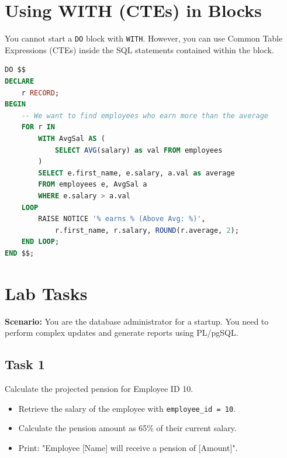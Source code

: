 \documentclass[12pt,a4paper]{article}
\newif\ifshowsolutions
\begin{document}
\newpage
\section{Using WITH (CTEs) in Blocks}

You cannot start a \texttt{DO} block with \texttt{WITH}. However, you can use Common Table Expressions (CTEs) inside the SQL statements contained within the block.

\begin{lstlisting}[language=SQL, caption={CTE inside Anonymous Block}]
DO $$ 
DECLARE
    r RECORD;
BEGIN
    -- We want to find employees who earn more than the average
    FOR r IN 
        WITH AvgSal AS (
            SELECT AVG(salary) as val FROM employees
        )
        SELECT e.first_name, e.salary, a.val as average
        FROM employees e, AvgSal a
        WHERE e.salary > a.val
    LOOP
        RAISE NOTICE '% earns % (Above Avg: %)', 
            r.first_name, r.salary, ROUND(r.average, 2);
    END LOOP;
END $$;
\end{lstlisting}

\newpage
\section{Lab Tasks}

\textbf{Scenario:} You are the database administrator for a startup. You need to perform complex updates and generate reports using PL/pgSQL.

\subsection*{Task 1}
Calculate the projected pension for Employee ID 10.
\begin{itemize}
    \item Retrieve the salary of the employee with \texttt{employee\_id = 10}.
    \item Calculate the pension amount as 65\% of their current salary.
    \item Print: "Employee [Name] will receive a pension of [Amount]".
\end{itemize}

\ifshowsolutions
\textbf{Solution:}
\begin{lstlisting}[language=SQL]
DO $$ 
DECLARE
    v_name TEXT;
    v_salary NUMERIC;
    v_pension NUMERIC;
BEGIN
    -- Retrieve Name and Salary
    SELECT first_name || ' ' || last_name, salary 
    INTO v_name, v_salary
    FROM employees 
    WHERE employee_id = 10;

    -- Calculate 65%
    v_pension := v_salary * 0.65;

    RAISE NOTICE 'Employee % will receive a pension of %', v_name, v_pension;
END $$;
\end{lstlisting}
\fi
\end{document}
